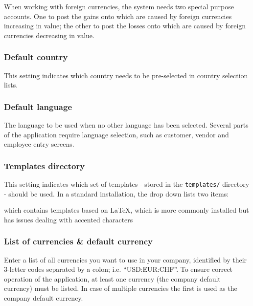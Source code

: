 When working with foreign currencies,
the system needs two special purpose accounts. One to post the gains onto which are
caused by foreign currencies increasing in value; the other to post the losses onto
which are caused by foreign currencies decreasing in value.


\subsubsection{Default country}
\label{subsubsec-company-config-defaults-country}

This setting indicates which country needs to be pre-selected
   in country selection lists.


\subsubsection{Default language}
\label{subsubsec-company-config-defaults-language}

The language to be used when no other language has been selected. Several parts of the
application require language selection, such as customer, vendor and employee entry screens.

\subsubsection{Templates directory}
\label{subsubsec-company-config-defaults-templates}

This setting indicates which set of templates - stored in the
   \texttt{templates/} directory - should be used. In a standard installation, the drop down
   lists two items:
\begin{description}[style=nextline]
   \item [demo] which contains templates based on \LaTeX, which is more commonly installed but has issues dealing with accented characters
   \end{description}


\subsubsection{List of currencies \& default currency}
\label{subsubsec-company-config-defaults-currencies}

Enter a list of all currencies you want
to use in your company, identified by their 3-letter codes separated by a colon; i.e.
``USD:EUR:CHF''. To ensure correct operation of the application, at least one currency
(the company default currency) must be listed. In case of multiple currencies the first
is used as the company default currency.

